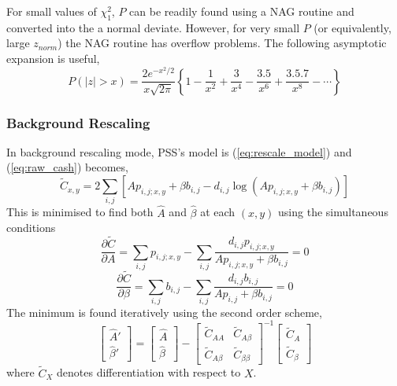 For small values of $\chi^2_1$, $P$ can be readily found using a NAG routine
and converted into the a normal deviate. However, for very small $P$ (or
equivalently, large $z_{norm}$) the NAG routine has overflow problems. The
following asymptotic expansion is useful,
\begin{equation}
P(|z| > x) = \frac{2 e^{-x^2/2}}{x \sqrt{2\pi} } \left\{ 1 -
\frac{1}{x^2} + \frac{3}{x^4} - \frac{3.5}{x^6} + \frac{3.5.7}{x^8} -
\cdots \right\}
\end{equation}


\subsubsection{Background Rescaling}
In background rescaling mode, PSS's model is (\ref{eq:rescale_model})
and (\ref{eq:raw_cash}) becomes,
\begin{equation} \label{eq:rescale_stat}
\tilde{C}_{x,y} = 2 \sum_{i,j} [ A p_{i,j;x,y} + \beta b_{i,j} - d_{i,j}
\log (A p_{i,j;x,y} + \beta b_{i,j}) ]
\end{equation}
This is minimised to find both $\hat{A}$ and $\hat{\beta}$ at each $(x,y)$ 
using the simultaneous conditions
\begin{equation}
\frac{\partial \tilde{C}}{\partial A} = \sum_{i,j} p_{i,j;x,y} - 
\sum_{i,j} \frac{d_{i,j}p_{i,j;x,y}}{A p_{i,j;x,y} + \beta b_{i,j}} = 0
\end{equation}
\begin{equation}
\frac{\partial \tilde{C}}{\partial \beta} = \sum_{i,j} b_{i,j} - 
\sum_{i,j} \frac{d_{i,j}b_{i,j}}{A p_{i,j} + \beta b_{i,j}} = 0
\end{equation}
The minimum is found iteratively using the second order scheme,
\begin{equation}
\left[ \begin{array}{c} \hat{A}' \\ \hat{\beta}' \end{array} \right] =
\left[ \begin{array}{c} \hat{A} \\ \hat{\beta} \end{array} \right] -
{\left[ \begin{array}{cc} \tilde{C}_{AA} & \tilde{C}_{A \beta} \\
\tilde{C}_{A \beta} & \tilde{C}_{\beta \beta}  \end{array} \right]}^{-1}
\left[ \begin{array}{c} \tilde{C}_{A} \\ \tilde{C}_{\beta} \end{array} \right]
\end{equation}
where $\tilde{C}_{X}$ denotes differentiation with respect to $X$.

